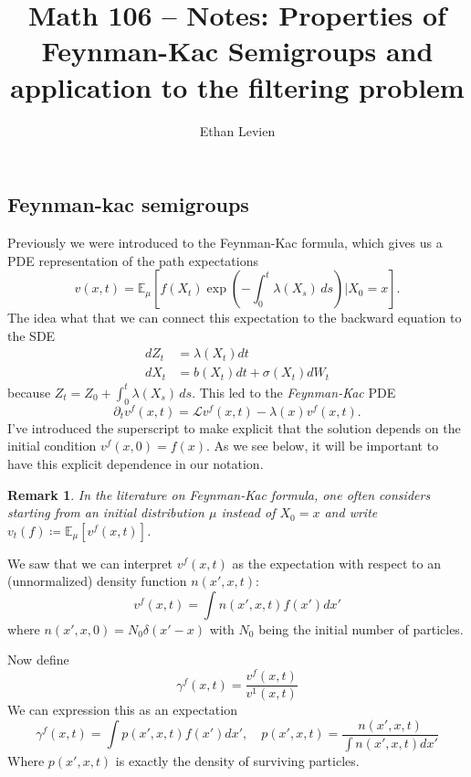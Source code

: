 \documentclass[11pt]{article}
\title{Math 106 -- Notes: Properties of Feynman-Kac Semigroups and application to the filtering problem }
\author{Ethan Levien}
\date{}
\newtheorem{remark}{Remark}
\begin{document}
\maketitle


\subsection*{Feynman-kac semigroups}
Previously we were introduced to the Feynman-Kac formula, which gives us a PDE representation of the path expectations 
\begin{equation}
v(x,t)  = {\mathbb E}_{\mu}\!\left[f(X_t)
\exp\!\left(-\int_0^t \lambda(X_s)\,ds\right)|X_0=x
\right]. 
\end{equation}
The idea what that we can connect this expectation to the backward equation to the SDE
\begin{align}
dZ_t &= \lambda(X_t)dt\\
dX_t &= b(X_t)dt + \sigma(X_t)dW_t
\end{align}
because $Z_t = Z_0+\int_0^t\lambda(X_s)\,ds$. This led to the 
\emph{Feynman-Kac} PDE
\begin{equation}\label{eq:fk}
\partial_t v^f(x,t) = {\mathcal L}v^f(x,t) -\lambda(x) v^f(x,t).
\end{equation}
I've introduced the superscript to make explicit that the solution depends on the initial condition $v^f(x,0) = f(x)$. As we see below, it will be important to have this explicit dependence in our notation.
\begin{remark}
In the literature on Feynman-Kac formula, one often considers starting from an initial distribution $\mu$ instead of $X_0 =x$ and write $v_t(f) \coloneqq {\mathbb E}_{\mu}[v^f(x,t)]$. 
\end{remark}
We saw that we can interpret $v^f(x,t)$ as the expectation with respect to an (unnormalized) density function $n(x',x,t)$: 
\begin{equation}
v^f(x,t) = \int n(x',x,t)f(x')dx'
\end{equation}
where $n(x',x,0) = N_0\delta(x'-x)$ with $N_0$ being the initial number of particles. 

Now define 
\begin{equation}
\gamma^f(x,t) = \frac{v^f(x,t)}{v^1(x,t)}
\end{equation}
We can expression this as an expectation 
\begin{equation}
\gamma^f(x,t) = \int p(x',x,t) f(x')dx',\quad p(x',x,t) = \frac{n(x',x,t)}{\int n(x',x,t)dx'}
\end{equation}
Where $p(x',x,t)$ is exactly the density of surviving particles. 
\end{document}
